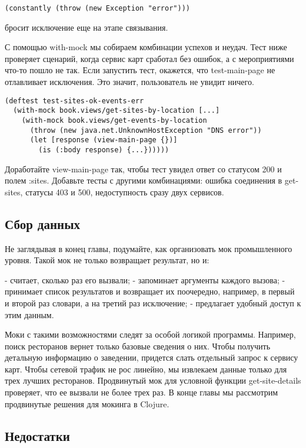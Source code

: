 \begin{verbatim}
(constantly (throw (new Exception "error")))
\end{verbatim}

бросит исключение еще на этапе связывания.

С помощью with-mock мы собираем комбинации успехов и неудач. Тест ниже проверяет
сценарий, когда сервис карт сработал без ошибок, а с мероприятиями что-то пошло
не так. Если запустить тест, окажется, что test-main-page не отлавливает
исключения. Это значит, пользователь не увидит ничего.

\begin{verbatim}
(deftest test-sites-ok-events-err
  (with-mock book.views/get-sites-by-location [...]
    (with-mock book.views/get-events-by-location
      (throw (new java.net.UnknownHostException "DNS error"))
      (let [response (view-main-page {})]
        (is (:body response) {...})))))
\end{verbatim}

Доработайте view-main-page так, чтобы тест увидел ответ со статусом 200 и полем
:sites. Добавьте тесты с другими комбинациями: ошибка соединения в get-sites,
статусы 403 и 500, недоступность сразу двух сервисов.

\subsection{Сбор данных}

Не заглядывая в конец главы, подумайте, как организовать мок промышленного
уровня. Такой мок не только возвращает результат, но и:

- считает, сколько раз его вызвали;
- запоминает аргументы каждого вызова;
- принимает список результатов и возвращает их поочередно, например, в первый и
  второй раз словари, а на третий раз исключение;
- предлагает удобный доступ к этим данным.

Моки с такими возможностями следят за особой логикой программы. Например, поиск
ресторанов вернет только базовые сведения о них. Чтобы получить детальную
информацию о заведении, придется слать отдельный запрос к сервису карт. Чтобы
сетевой трафик не рос линейно, мы извлекаем данные только для трех лучших
ресторанов. Продвинутый мок для условной функции get-site-details проверяет, что
ее вызвали не более трех раз. В конце главы мы рассмотрим продвинутые решения
для мокинга в Clojure.

\subsection{Недостатки}

